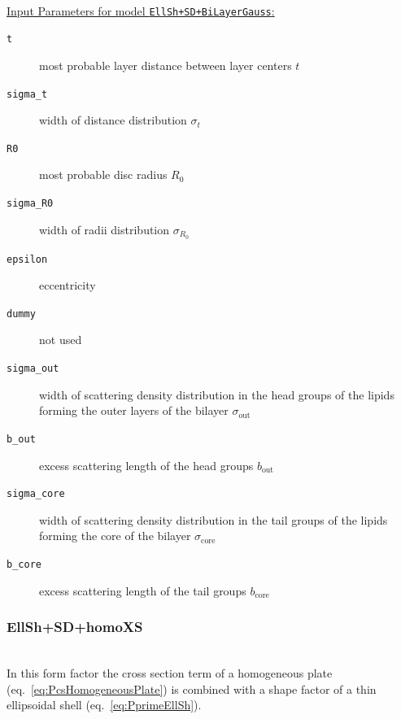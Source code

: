 \hspace{1pt}\\
\uline{Input Parameters for model \texttt{EllSh+SD+BiLayerGauss}:}\\
\begin{description}
\item[\texttt{t}] most probable layer distance between layer centers $t$
\item[\texttt{sigma\_t}] width of distance distribution $\sigma_t$
\item[\texttt{R0}] most probable disc radius $R_0$
\item[\texttt{sigma\_R0}] width of radii distribution $\sigma_{R_0}$
\item[\texttt{epsilon}] eccentricity
\item[\texttt{dummy}] not used
\item[\texttt{sigma\_out}] width of scattering density distribution in the head groups of the lipids forming the outer layers of the bilayer $\sigma_\mathrm{out}$
\item[\texttt{b\_out}] excess scattering length of the head groups $b_\mathrm{out}$
\item[\texttt{sigma\_core}] width of scattering density distribution in the tail groups of the lipids forming the core of the bilayer $\sigma_\mathrm{core}$
\item[\texttt{b\_core}] excess scattering length of the tail groups $b_\mathrm{core}$
\end{description}

\vspace{5mm}

\noindent
\subsubsection{EllSh+SD+homoXS} ~\\

\noindent
In this form factor the cross section term of a homogeneous plate (eq.\ \ref{eq:PcsHomogeneousPlate}) is combined with a shape factor of a thin ellipsoidal shell (eq.\ \ref{eq:PprimeEllSh}).

\vspace{5mm}

